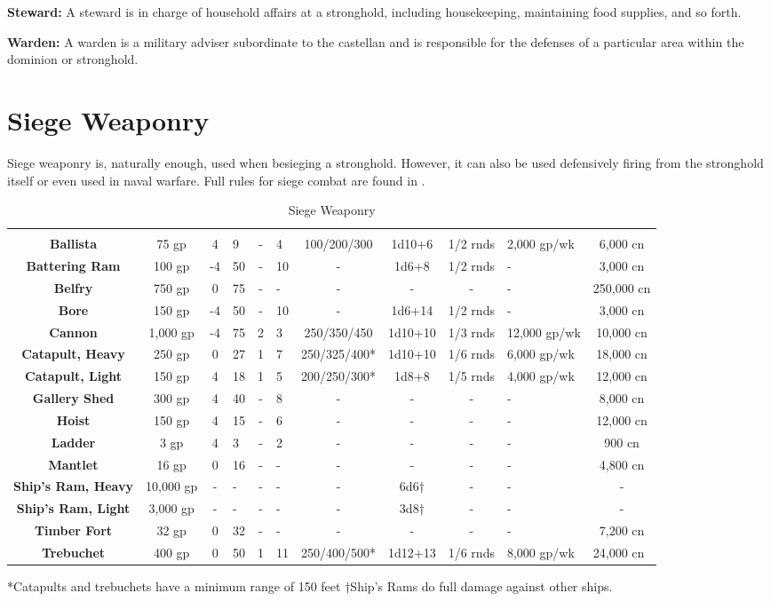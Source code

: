\begin{multicols*}{2}
\textbf{Steward:} A steward is in charge of household affairs at a stronghold, including housekeeping, maintaining food supplies, and so forth.

\textbf{Warden:} A warden is a military adviser subordinate to the castellan and is responsible for the defenses of a particular area within the dominion or stronghold.

\section{Siege Weaponry}
Siege weaponry is, naturally enough, used when besieging a stronghold. However, it can also be used defensively firing from the stronghold itself or even used in naval warfare. Full rules for siege combat are found in .

\end{multicols*}
\begin {table}[H]
  \caption{Siege Weaponry}
	\begin{tabularx}{\columnwidth}{>{\bfseries}cccYcYcccM{.6in}c}
		 &  &  & \scriptsize{} & \scriptsize{} & \scriptsize{} &  &  &  &  & \\
		Ballista & 75 gp & 4 & 9 & - & 4 & 100/200/300 & 1d10+6 & 1/2 rnds & 2,000 gp/wk & 6,000 cn\\
		Battering Ram & 100 gp & -4 & 50 & - & 10 & - & 1d6+8 & 1/2 rnds & - & 3,000 cn\\
		Belfry & 750 gp & 0 & 75 & - & - & - & - & - & - & 250,000 cn\\
		Bore & 150 gp & -4 & 50 & - & 10 & - & 1d6+14 & 1/2 rnds & - & 3,000 cn\\
		Cannon & 1,000 gp & -4 & 75 & 2 & 3 & 250/350/450 & 1d10+10 & 1/3 rnds & 12,000 gp/wk & 10,000 cn\\
		Catapult, Heavy & 250 gp & 0 & 27 & 1 & 7 & 250/325/400* & 1d10+10 & 1/6 rnds & 6,000 gp/wk & 18,000 cn\\
		Catapult, Light & 150 gp & 4 & 18 & 1 & 5 & 200/250/300* & 1d8+8 & 1/5 rnds & 4,000 gp/wk & 12,000 cn\\
		Gallery Shed & 300 gp & 4 & 40 & - & 8 & - & - & - & - & 8,000 cn\\
		Hoist & 150 gp & 4 & 15 & - & 6 & - & - & - & - & 12,000 cn\\
		Ladder & 3 gp & 4 & 3 & - & 2 & - & - & - & - & 900 cn\\
		Mantlet & 16 gp & 0 & 16 & - & - & - & - & - & - & 4,800 cn\\
		Ship’s Ram, Heavy & 10,000 gp & - & - & - & - & - & 6d6† & - & - & -\\
		Ship’s Ram, Light & 3,000 gp & - & - & - & - & - & 3d8† & - & - & -\\
		Timber Fort & 32 gp & 0 & 32 & - & - & - & - & - & - & 7,200 cn\\
		Trebuchet & 400 gp & 0 & 50 & 1 & 11 & 250/400/500* & 1d12+13 & 1/6 rnds & 8,000 gp/wk & 24,000 cn\
  \end {tabularx}
*Catapults and trebuchets have a minimum range of 150 feet
†Ship’s Rams do full damage against other ships.
\end {table}
